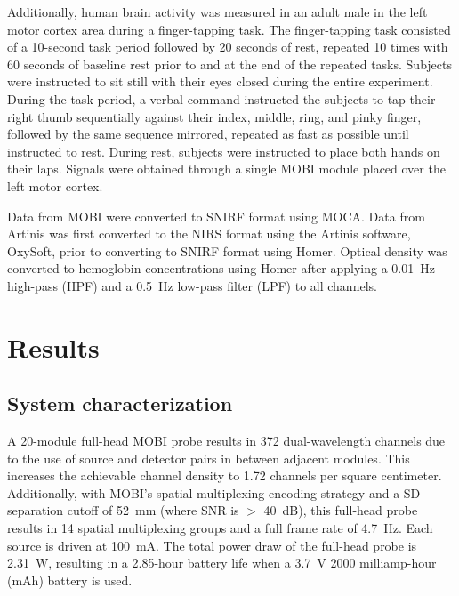 Additionally, human brain activity was measured in an adult male in the left motor cortex area during a finger-tapping task. The finger-tapping task consisted of a 10-second task period followed by 20 seconds of rest, repeated 10 times with 60 seconds of baseline rest prior to and at the end of the repeated tasks. Subjects were instructed to sit still with their eyes closed during the entire experiment. During the task period, a verbal command instructed the subjects to tap their right thumb sequentially against their index, middle, ring, and pinky finger, followed by the same sequence mirrored, repeated as fast as possible until instructed to rest. During rest, subjects were instructed to place both hands on their laps. Signals were obtained through a single \ac{MOBI} module placed over the left motor cortex. 

Data from \ac{MOBI} were converted to SNIRF format using MOCA. Data from Artinis was first converted to the NIRS format using the Artinis software, OxySoft, prior to converting to SNIRF format using Homer. Optical density was converted to hemoglobin concentrations using Homer after applying a 0.01~Hz high-pass (HPF) and a 0.5~Hz low-pass filter (LPF) to all channels. 



\section{Results}
\label{chap:mobi:results}
\subsection{System characterization}
A 20-module full-head \ac{MOBI} probe results in 372 dual-wavelength channels due to the use of source and detector pairs in between adjacent modules. This increases the achievable channel density to 1.72 channels per square centimeter. Additionally, with \ac{MOBI}'s spatial multiplexing encoding strategy and a \ac{SD} separation cutoff of 52~mm (where SNR is $>$ 40~dB), this full-head probe results in 14 spatial multiplexing groups and a full frame rate of 4.7~Hz. Each source is driven at 100~mA. The total power draw of the full-head probe is 2.31~W, resulting in a 2.85-hour battery life when a 3.7~V 2000 milliamp-hour (mAh) battery is used.

